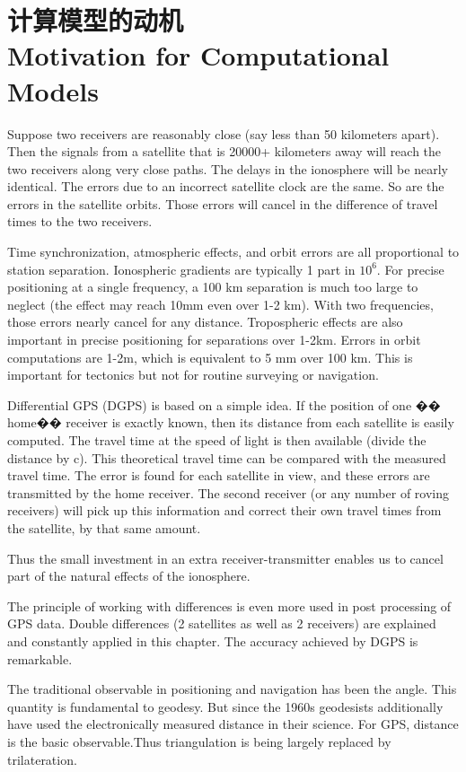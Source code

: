 \section[计算模型的动机]{计算模型的动机\\Motivation for Computational Models}
Suppose two receivers are reasonably close (say less than 50 kilometers apart). Then the signals from a satellite that is 20000+ kilometers away will reach the two receivers along very close paths. The delays in the ionosphere will be nearly identical. The errors due to an incorrect satellite clock are the same. So are the errors in the satellite orbits. Those errors will cancel in the difference of travel times to the two receivers.

Time synchronization, atmospheric effects, and orbit errors are all proportional to station separation. Ionospheric gradients are typically 1 part in $10^{6}$. For precise positioning at a single frequency, a 100 km separation is much too large to neglect (the effect may reach 10mm even over 1-2 km). With two frequencies, those errors nearly cancel for any distance. Tropospheric effects are also important in precise positioning for separations over 1-2km. Errors in orbit computations are 1-2m, which is equivalent to 5 mm over 100 km. This is important for tectonics but not for routine surveying or navigation.

Differential GPS (DGPS) is based on a simple idea. If the position of one �� home�� receiver is exactly known, then its distance from each satellite is easily computed. The travel time at the speed of light is then available (divide the distance by c). This theoretical travel time can be compared with the measured travel time. The error is found for each satellite in view, and these errors are transmitted by the home receiver. The second receiver (or any number of roving receivers) will pick up this information and correct their own travel times from the satellite, by that same amount.

Thus the small investment in an extra receiver-transmitter enables us to cancel part
of the natural effects of the ionosphere.

The principle of working with differences is even more used in post processing of GPS data. Double differences (2 satellites as well as 2 receivers) are explained and constantly applied in this chapter. The accuracy achieved by DGPS is remarkable.

The traditional observable in positioning and navigation has been the angle. This quantity
is fundamental to geodesy. But since the 1960s geodesists additionally have used the electronically measured distance in their science. For GPS, distance is the basic observable.Thus triangulation is being largely replaced by trilateration.

